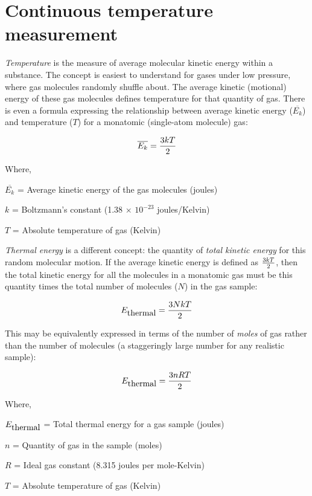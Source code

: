 
\chapter{Continuous temperature measurement}

\textit{Temperature} is the measure of average molecular kinetic energy within a substance.  The concept is easiest to understand for gases under low pressure, where gas molecules randomly shuffle about.  The average kinetic (motional) energy of these gas molecules defines temperature for that quantity of gas.  There is even a formula expressing the relationship between average kinetic energy ($\overline{E_k}$) and temperature ($T$) for a monatomic (single-atom molecule) gas: 

$$\overline{E_k} = {3 k T \over 2}$$

\noindent
Where,

$\overline{E_k}$ = Average kinetic energy of the gas molecules (joules)

$k$ = Boltzmann's constant (1.38 $\times$ $10^{-23}$ joules/Kelvin)

$T$ = Absolute temperature of gas (Kelvin)

\vskip 10pt

\textit{Thermal energy} is a different concept: the quantity of \textit{total kinetic energy} for this random molecular motion.  If the average kinetic energy is defined as $3 k T \over 2$, then the total kinetic energy for all the molecules in a monatomic gas must be this quantity times the total number of molecules ($N$) in the gas sample: 

$${E_{\hbox{thermal}}} = {3 N k T \over 2}$$

\filbreak

This may be equivalently expressed in terms of the number of \textit{moles} of gas rather than the number of molecules (a staggeringly large number for any realistic sample):

$${E_{\hbox{thermal}}} = {3 n R T \over 2}$$

\noindent
Where,

${E_{\hbox{thermal}}}$ = Total thermal energy for a gas sample (joules)

$n$ = Quantity of gas in the sample (moles)

$R$ = Ideal gas constant (8.315 joules per mole-Kelvin)

$T$ = Absolute temperature of gas (Kelvin)

\vskip 10pt

